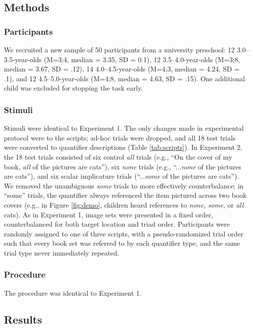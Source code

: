 \documentclass[man]{apa2}
\begin{document}
\subsection{Methods}
\subsubsection{Participants} 

We recruited a new sample of 50 participants from a university preschool: 12 3.0--3.5-year-olds (M=3;4, median = 3.35, SD = 0.1), 12 3.5--4.0-year-olds (M=3;8, median = 3.67, SD = .12), 14 4.0--4.5-year-olds (M=4;3, median = 4.24, SD = .1), and 12 4.5--5.0-year-olds (M=4;8, median = 4.63, SD = .15). One additional child was excluded for stopping the task early.

\subsubsection{Stimuli}
Stimuli were identical to Experiment 1. The only changes made in experimental protocol were to the scripts; ad-hoc trials were dropped, and all 18 test trials were converted to quantifier descriptions (Table \ref{tab:scripts}). In Experiment 2, the 18 test trials consisted of six control \textit{all} trials (e.g., ``On the cover of my book, \textit{all} of the pictures are cats''), six \textit{none} trials (e.g., ``...\textit{none} of the pictures are cats''), and six scalar implicature trials (``...\textit{some} of the pictures are cats''). We removed the unambiguous \textit{some} trials to more effectively counterbalance; in ``some'' trials, the quantifier always referenced the item pictured across two book covers (e.g., in Figure \ref{fig:demo}, children heard references to \textit{none, some,} or \textit{all} cats). As in Experiment 1, image sets were presented in a fixed order, counterbalanced for both target location and triad order. Participants were randomly assigned to one of three scripts, with a pseudo-randomized trial order such that every book set was referred to by each quantifier type, and the same trial type never immediately repeated.

\subsubsection{Procedure}
The procedure was identical to Experiment 1. 

\subsection{Results}
\end{document}
